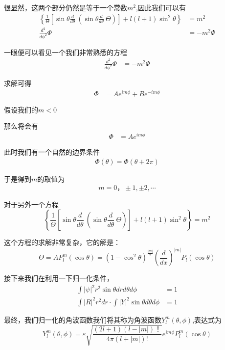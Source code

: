 \documentclass{article}
\newcommand{\D}[2]{\frac{d}{d#2}#1}
\begin{document}
很显然，这两个部分仍然是等于一个常数$m^2$,因此我们可以有
\begin{align*}
	\left\{\frac{1}{\Theta}\left[\sin{\theta}\D{~}{\theta}\left(\sin{\theta}\D{~}{\theta}\Theta\right)\right]+l(l+1)\sin^2{\theta}\right\} & =m^2      \\
	\frac{d^2}{d\phi^2}\Phi                                                                                                                & =-m^2\Phi
\end{align*}

一眼便可以看见一个我们非常熟悉的方程
\begin{align*}
	\frac{d^2}{d\phi^2}\Phi & =-m^2\Phi
\end{align*}

求解可得
\begin{align*}
	\Phi & =Ae^{im\phi}+Be^{-im\phi}
\end{align*}

假设我们的$m<0$

那么将会有
\begin{align*}
	\Phi & =Ae^{im\phi}
\end{align*}

此时我们有一个自然的边界条件
\begin{align*}
	\Phi(\theta)=\Phi(\theta+2\pi)
\end{align*}

于是得到$m$的取值为
\begin{align*}
	m=0，\pm 1,\pm 2,\cdots
\end{align*}

对于另外一个方程
\begin{equation*}
	\left\{\frac{1}{\Theta}\left[\sin{\theta}\D{~}{\theta}\left(\sin{\theta}\D{~}{\theta}\Theta\right)\right]+l(l+1)\sin^2{\theta}\right\}=m^2
\end{equation*}

这个方程的求解非常复杂，它的解是：
\begin{equation*}
	\Theta=AP_l^m(\cos{\theta})=(1-\cos^2{\theta})^{\frac{|m|}{2}}\left(\frac{d}{dx}\right)^{|m|}P_l(\cos{\theta})
\end{equation*}

接下来我们在利用一下归一化条件，
\begin{align*}
	\int|\psi|^2r^2\sin{\theta}drd\theta d\phi            & =1 \\
	\int|R|^2r^2dr\cdot\int|Y|^2\sin{\theta}d\theta d\phi & =1
\end{align*}

最终，我们归一化的角波函数我们将其称为角波函数$Y_l^m(\theta,\phi)$,表达式为
\begin{equation*}
	Y_l^m(\theta,\phi)=\varepsilon\sqrt{\frac{(2l+1)(l-|m|)！}{4\pi(l+|m|)!}}e^{im\phi}P_l^m(\cos{\theta})
\end{equation*}
\end{document}
